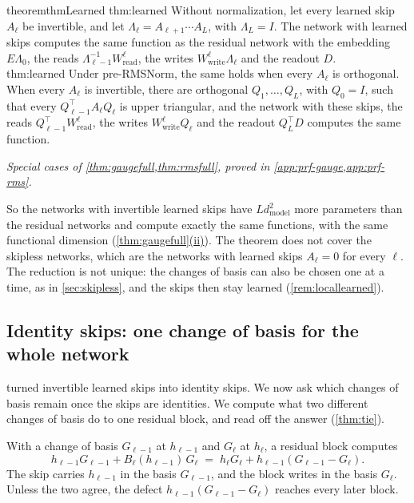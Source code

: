 \documentclass[10pt]{article}
\theoremstyle{definition}
\theoremstyle{remark}
\newcommand{\Wread}{W_{\mathrm{read}}}
\newcommand{\Wwrite}{W_{\mathrm{write}}}
\newcommand{\dm}{d_{\mathrm{model}}}
\newcommand{\ptlabel}[1]{\phantomsection\label{#1}}
\DeclareRobustCommand{\cpref}[2]{\hyperref[#1:#2]{\cref*{#1}(#2)}}
\newcommand{\stpart}[3]{\ifx\relax#1\relax\else\ptlabel{#1:#2}\fi{\upshape\bfseries\boldmath(#2)\ifx\relax#3\relax\else\ #3.\fi}}
\begin{document}
\begin{restatable}{theorem}{thmLearned}\label{thm:learned}
\stpart{thm:learned}{i}{} Without normalization, let every learned skip $A_\ell$ be invertible, and let $\Lambda_\ell = A_{\ell+1}\cdots A_L$, with $\Lambda_L = I$. The network with learned skips computes the same function as the residual network with the embedding $E\Lambda_0$, the reads $\Lambda_{\ell-1}^{-1}\Wread^{\ell}$, the writes $\Wwrite^{\ell}\Lambda_\ell$ and the readout $D$.\\
\stpart{thm:learned}{ii}{} Under pre-RMSNorm, the same holds when every $A_\ell$ is orthogonal. When every $A_\ell$ is invertible, there are orthogonal $Q_1, \dots, Q_L$, with $Q_0 = I$, such that every $Q_{\ell-1}^\top A_\ell Q_\ell$ is upper triangular, and the network with these skips, the reads $Q_{\ell-1}^\top\Wread^{\ell}$, the writes $\Wwrite^{\ell}Q_\ell$ and the readout $Q_L^\top D$ computes the same function.
\end{restatable}
\par\vspace{-0.4\baselineskip}\noindent\hfill{\small\itshape Special cases of \cref{thm:gaugefull,thm:rmsfull}, proved in \cref{app:prf-gauge,app:prf-rms}.}\par\smallskip

So the networks with invertible learned skips have $L\dm^2$ more parameters than the residual networks and compute exactly the same functions, with the same functional dimension (\cpref{thm:gaugefull}{ii}). The theorem does not cover the skipless networks, which are the networks with learned skips $A_\ell = 0$ for every $\ell$. The reduction is not unique: the changes of basis can also be chosen one at a time, as in \cref{sec:skipless}, and the skips then stay learned (\cref{rem:locallearned}).

\subsection{Identity skips: one change of basis for the whole network}\label{sec:global}\label{sec:gaugefix}

 turned invertible learned skips into identity skips. We now ask which changes of basis remain once the skips are identities. We compute what two different changes of basis do to one residual block, and read off the answer (\cref{thm:tie}).

With a change of basis $G_{\ell-1}$ at $h_{\ell-1}$ and $G_\ell$ at $h_\ell$, a residual block computes
\begin{equation}\label{eq:defect}
h_{\ell-1}G_{\ell-1} + B_\ell(h_{\ell-1})\,G_\ell \;=\; h_\ell G_\ell + h_{\ell-1}(G_{\ell-1} - G_\ell).
\end{equation}
The skip carries $h_{\ell-1}$ in the basis $G_{\ell-1}$, and the block writes in the basis $G_\ell$. Unless the two agree, the defect $h_{\ell-1}(G_{\ell-1} - G_\ell)$ reaches every later block.
\end{document}
